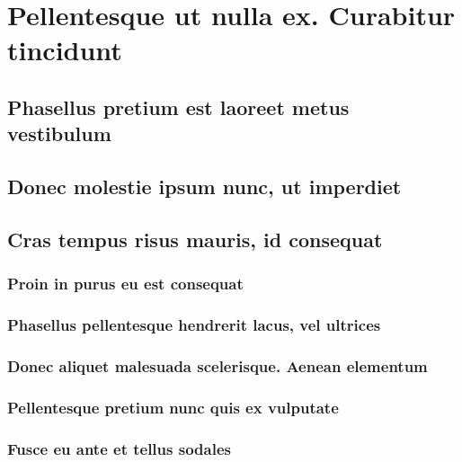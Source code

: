 \documentclass[%
  german,%
  exercise,%
  oneside,%
]{iswartcl}
\begin{document}
\lipsum[1-8]

\section{Pellentesque ut nulla ex. Curabitur tincidunt}

\lipsum[1-8]

\subsection{Phasellus pretium est laoreet metus vestibulum}

\lipsum[1-8]

\subsection{Donec molestie ipsum nunc, ut imperdiet}

\lipsum[1-8]

\subsection{Cras tempus risus mauris, id consequat}

\lipsum[1-8]

\subsubsection{Proin in purus eu est consequat}

\lipsum[1-8]

\subsubsection{Phasellus pellentesque hendrerit lacus, vel ultrices}

\lipsum[1-8]

\subsubsection{Donec aliquet malesuada scelerisque. Aenean elementum}

\lipsum[1-8]

\subsubsection{Pellentesque pretium nunc quis ex vulputate}

\lipsum[1-8]

\subsubsection{Fusce eu ante et tellus sodales}
\end{document}
